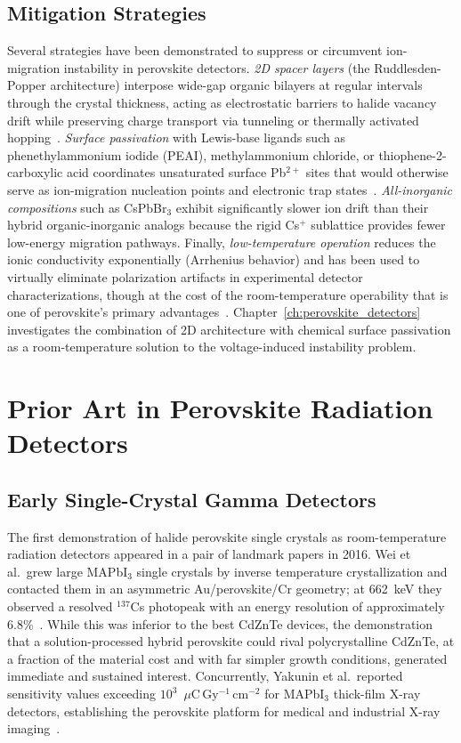 \subsection{Mitigation Strategies}

Several strategies have been demonstrated to suppress or circumvent
ion-migration instability in perovskite detectors.  \emph{2D spacer layers}
(the Ruddlesden-Popper architecture) interpose wide-gap organic bilayers
at regular intervals through the crystal thickness, acting as
electrostatic barriers to halide vacancy drift while preserving charge
transport via tunneling or thermally activated hopping~\cite{Tsai2018}.
\emph{Surface passivation} with Lewis-base ligands such as
phenethylammonium iodide (PEAI), methylammonium chloride, or
thiophene-2-carboxylic acid coordinates unsaturated surface Pb$^{2+}$
sites that would otherwise serve as ion-migration nucleation points and
electronic trap states~\cite{Cao2018}.  \emph{All-inorganic compositions}
such as CsPbBr$_3$ exhibit significantly slower ion drift than their
hybrid organic-inorganic analogs because the rigid Cs$^+$ sublattice
provides fewer low-energy migration pathways.  Finally,
\emph{low-temperature operation} reduces the ionic conductivity
exponentially (Arrhenius behavior) and has been used to virtually
eliminate polarization artifacts in experimental detector
characterizations, though at the cost of the room-temperature operability
that is one of perovskite's primary advantages~\cite{He_NatPhoton_2021}.
Chapter~\ref{ch:perovskite_detectors} investigates the combination of 2D
architecture with chemical surface passivation as a room-temperature
solution to the voltage-induced instability problem.

\section{Prior Art in Perovskite Radiation Detectors}
\label{sec:prior_art}

\subsection{Early Single-Crystal Gamma Detectors}

The first demonstration of halide perovskite single crystals as
room-temperature radiation detectors appeared in a pair of landmark
papers in 2016.  Wei et al.\ grew large MAPbI$_3$ single crystals by
inverse temperature crystallization and contacted them in an asymmetric
Au/perovskite/Cr geometry; at 662~keV they observed a resolved
$^{137}$Cs photopeak with an energy resolution of approximately
6.8\%~\cite{Wei2016}.  While this was inferior to the best CdZnTe
devices, the demonstration that a solution-processed hybrid perovskite
could rival polycrystalline CdZnTe, at a fraction of the material cost
and with far simpler growth conditions, generated immediate and sustained
interest.  Concurrently, Yakunin et al.\ reported sensitivity values
exceeding $10^3$~$\mu$C\,Gy$^{-1}$\,cm$^{-2}$ for MAPbI$_3$
thick-film X-ray detectors, establishing the perovskite
platform for medical and industrial X-ray imaging~\cite{Yakunin2015}.


